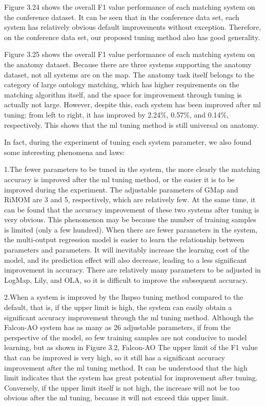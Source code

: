 \documentclass[twoside]{article}
\begin{document}
Figure 3.24 shows the overall F1 value performance of each matching system on the conference dataset.
It can be seen that in the conference data set, each system has relatively obvious default improvements without exception. Therefore, on the conference data set, our proposed tuning method also has good generality.

Figure 3.25 shows the overall F1 value performance of each matching system on the anatomy dataset.
Because there are three systems supporting the anatomy dataset, not all systems are on the map.
The anatomy task itself belongs to the category of large ontology matching, which has higher requirements on the matching algorithm itself, and the space for improvement through tuning is actually not large.
However, despite this, each system has been improved after ml tuning: from left to right, it has improved by 2.24\%, 0.57\%, and 0.14\%, respectively. This shows that the ml tuning method is still universal on anatomy.

In fact, during the experiment of tuning each system parameter, we also found some interesting phenomena and laws:

1.The fewer parameters to be tuned in the system, the more clearly the matching accuracy is improved after the ml tuning method, or the easier it is to be improved during the experiment.
The adjustable parameters of GMap and RiMOM are 3 and 5, respectively, which are relatively few. At the same time, it can be found that the accuracy improvement of these two systems after tuning is very obvious.
This phenomenon may be because the number of training samples is limited (only a few hundred). When there are fewer parameters in the system, the multi-output regression model is easier to learn the relationship between parameters and parameters. It will inevitably increase the learning cost of the model, and its prediction effect will also decrease, leading to a less significant improvement in accuracy. There are relatively many parameters to be adjusted in LogMap, Lily, and OLA, so it is difficult to improve the subsequent accuracy.

2.When a system is improved by the lhspso tuning method compared to the default, that is, if the upper limit is high, the system can easily obtain a significant accuracy improvement through the ml tuning method.
Although the Falcon-AO system has as many as 26 adjustable parameters, if from the perspective of the model, so few training samples are not conducive to model learning, but as shown in Figure 3.2, Falcon-AO The upper limit of the F1 value that can be improved is very high, so it still has a significant accuracy improvement after the ml tuning method. It can be understood that the high limit indicates that the system has great potential for improvement after tuning.
Conversely, if the upper limit itself is not high, the increase will not be too obvious after the ml tuning, because it will not exceed this upper limit.
\end{document}
